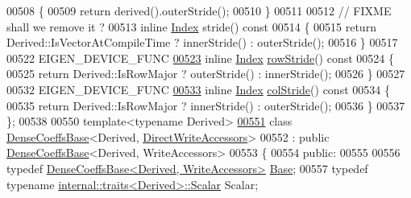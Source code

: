 \begin{DoxyCode}
00508 \textcolor{keyword}{    }\{
00509       \textcolor{keywordflow}{return} derived().outerStride();
00510     \}
00511 
00512     \textcolor{comment}{// FIXME shall we remove it ?}
00513     \textcolor{keyword}{inline} \hyperlink{group___core___module_a554f30542cc2316add4b1ea0a492ff02}{Index} stride()\textcolor{keyword}{ const}
00514 \textcolor{keyword}{    }\{
00515       \textcolor{keywordflow}{return} Derived::IsVectorAtCompileTime ? innerStride() : outerStride();
00516     \}
00517 
00522     EIGEN\_DEVICE\_FUNC
\hyperlink{group___core___module_aaf7d19edb8f92962ab2e3ab475d2a879}{00523}     \textcolor{keyword}{inline} \hyperlink{group___core___module_a554f30542cc2316add4b1ea0a492ff02}{Index} \hyperlink{group___core___module_aaf7d19edb8f92962ab2e3ab475d2a879}{rowStride}()\textcolor{keyword}{ const}
00524 \textcolor{keyword}{    }\{
00525       \textcolor{keywordflow}{return} Derived::IsRowMajor ? outerStride() : innerStride();
00526     \}
00527 
00532     EIGEN\_DEVICE\_FUNC
\hyperlink{group___core___module_ab4ec982807214e8e7ce4d27f7009a43d}{00533}     \textcolor{keyword}{inline} \hyperlink{group___core___module_a554f30542cc2316add4b1ea0a492ff02}{Index} \hyperlink{group___core___module_ab4ec982807214e8e7ce4d27f7009a43d}{colStride}()\textcolor{keyword}{ const}
00534 \textcolor{keyword}{    }\{
00535       \textcolor{keywordflow}{return} Derived::IsRowMajor ? innerStride() : outerStride();
00536     \}
00537 \};
00538 
00550 \textcolor{keyword}{template}<\textcolor{keyword}{typename} Derived>
\hyperlink{group___core___module}{00551} \textcolor{keyword}{class }\hyperlink{class_eigen_1_1_dense_coeffs_base}{DenseCoeffsBase}<Derived, \hyperlink{group__enums_gga9f93eac38eb83deb0e8dbd42ddf11d5dae218802d4436c6907e60368c28609472}{DirectWriteAccessors}>
00552   : \textcolor{keyword}{public} \hyperlink{class_eigen_1_1_dense_coeffs_base}{DenseCoeffsBase}<Derived, WriteAccessors>
00553 \{
00554   \textcolor{keyword}{public}:
00555 
00556     \textcolor{keyword}{typedef} \hyperlink{group___core___module_class_eigen_1_1_dense_coeffs_base_3_01_derived_00_01_write_accessors_01_4}{DenseCoeffsBase<Derived, WriteAccessors>} 
      \hyperlink{group___core___module_struct_eigen_1_1_eigen_base}{Base};
00557     \textcolor{keyword}{typedef} \textcolor{keyword}{typename} \hyperlink{struct_eigen_1_1internal_1_1traits}{internal::traits<Derived>::Scalar} Scalar;

\end{DoxyCode}
